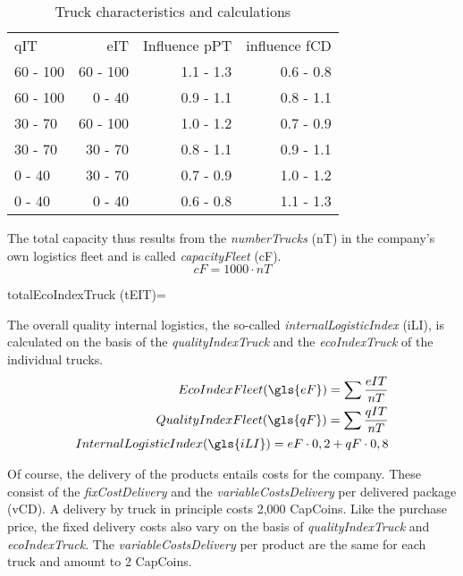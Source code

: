 \begin{table}[ht]
    \centering
    \begin{tabular}{|l|r|r|r|}
    \hline
    qIT & eIT & Influence pPT & influence fCD \\
    60 - 100      & 60 - 100   & 1.1 - 1.3   & 0.6 - 0.8       \\
    60 - 100      & 0 - 40     & 0.9 - 1.1   & 0.8 - 1.1       \\
    30 - 70       & 60 - 100   & 1.0 - 1.2   & 0.7 - 0.9       \\
    30 - 70       & 30 - 70    & 0.8 - 1.1   & 0.9 - 1.1       \\
    0 - 40        & 30 - 70    & 0.7 - 0.9   & 1.0 - 1.2       \\
    0 - 40        & 0 - 40     & 0.6 - 0.8   & 1.1 - 1.3       \\
    \hline
    \end{tabular}
    \caption{Truck characteristics and calculations}
    \label{Truck_characteristics}
\end{table}

The total capacity thus results from the \textit{numberTrucks} (\gls{nT}) in the company's own logistics fleet and is called \textit{capacityFleet} (\gls{cF}). 
\begin{equation}
\label{func:capacityFleet}
    cF = 1000 \cdot nT
\end{equation}


totalEcoIndexTruck (\gls{tEIT})= 

The overall quality internal logistics, the so-called \textit{internalLogisticIndex} (\gls{iLI}), is calculated on the basis of the \textit{qualityIndexTruck} and the \textit{ecoIndexTruck} of the individual trucks.
\begin{equation}
\label{func:internalLogisticIndex}
\begin{aligned}
    Eco Index Fleet (\gls{eF}) = \sum \frac{eIT}{nT} \\
    Quality Index Fleet (\gls{qF}) = \sum \frac{qIT}{nT}\\
    Internal Logistic Index (\gls{iLI}) = eF \cdot 0,2 + qF \cdot 0,8 \\
\end{aligned}
\end{equation}

Of course, the delivery of the products entails costs for the company. These consist of the \textit{fixCostDelivery} and the \textit{variableCostsDelivery} per delivered package (\gls{vCD}). 
A delivery by truck in principle costs 2,000 CapCoins. Like the purchase price, the fixed delivery costs also vary on the basis of \textit{qualityIndexTruck} and \textit{ecoIndexTruck}. The \textit{variableCostsDelivery} per product are the same for each truck and amount to 2 CapCoins.

